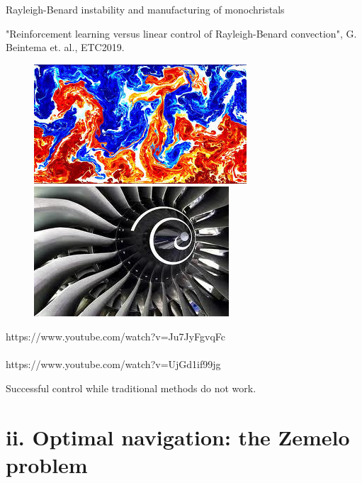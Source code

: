 \documentclass{beamer}
\begin{document}
\begin{frame}{Rayleigh-Benard instability and manufacturing of monochristals}

    "Reinforcement learning versus linear control of Rayleigh-Benard convection", G. Beintema et. al., ETC2019.
    
    \begin{figure}
    \begin{center}
      \includegraphics[width=.45\textwidth]{Figures/RBi}
      \hspace{1cm}
      \includegraphics[width=.35\textwidth]{Figures/monochristal}
    \end{center}
    \end{figure}
    
    
    \begin{center}
https://www.youtube.com/watch?v=Ju7JyFgvqFc \\~\\
https://www.youtube.com/watch?v=UjGd1if99jg
     
    \end{center}

    Successful control while traditional methods do not work.
\end{frame}


\section{ii. Optimal navigation: the Zemelo problem}
\end{document}

